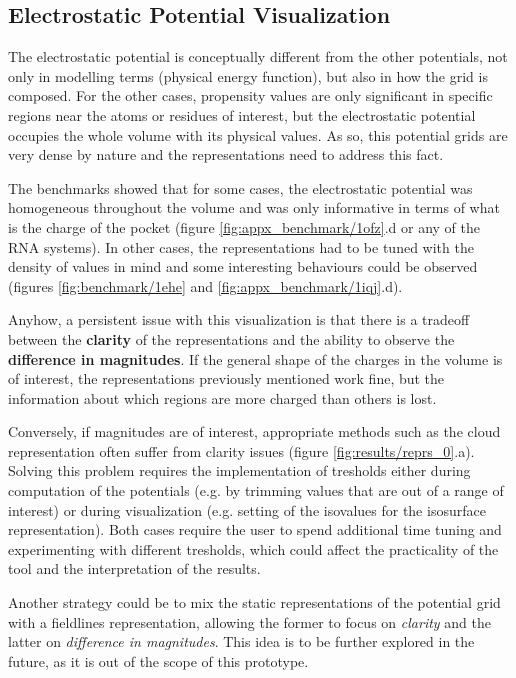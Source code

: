   \subsection{Electrostatic Potential Visualization}
    The electrostatic potential is conceptually different from the other potentials, not only in modelling terms (physical energy function), but also in how the grid is composed. For the other cases, propensity values are only significant in specific regions near the atoms or residues of interest, but the electrostatic potential occupies the whole volume with its physical values. As so, this potential grids are very dense by nature and the representations need to address this fact.

    The benchmarks showed that for some cases, the electrostatic potential was homogeneous throughout the volume and was only informative in terms of what is the charge of the pocket (figure \ref{fig:appx_benchmark/1ofz}.d or any of the RNA systems). In other cases, the representations had to be tuned with the density of values in mind and some interesting behaviours could be observed (figures \ref{fig:benchmark/1ehe} and \ref{fig:appx_benchmark/1iqj}.d).

    Anyhow, a persistent issue with this visualization is that there is a tradeoff between the \textbf{clarity} of the representations and the ability to observe the \textbf{difference in magnitudes}. If the general shape of the charges in the volume is of interest, the representations previously mentioned work fine, but the information about which regions are more charged than others is lost.

    Conversely, if magnitudes are of interest, appropriate methods such as the cloud representation often suffer from clarity issues (figure \ref{fig:results/reprs_0}.a). Solving this problem requires the implementation of tresholds either during computation of the potentials (e.g. by trimming values that are out of a range of interest) or during visualization (e.g. setting of the isovalues for the isosurface representation). Both cases require the user to spend additional time tuning and experimenting with different tresholds, which could affect the practicality of the tool and the interpretation of the results.

    Another strategy could be to mix the static representations of the potential grid with a fieldlines representation, allowing the former to focus on \textit{clarity} and the latter on \textit{difference in magnitudes}. This idea is to be further explored in the future, as it is out of the scope of this prototype.

